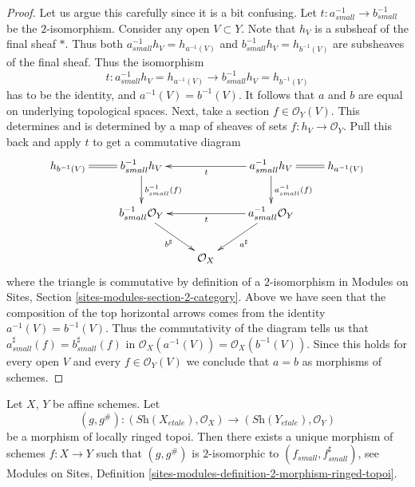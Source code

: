 \begin{proof}
Let us argue this carefully since it is a bit confusing.
Let $t : a_{small}^{-1} \to b_{small}^{-1}$ be the $2$-isomorphism.
Consider any open $V \subset Y$. Note that $h_V$ is a subsheaf of the
final sheaf $*$. Thus both $a_{small}^{-1}h_V = h_{a^{-1}(V)}$
and $b_{small}^{-1}h_V = h_{b^{-1}(V)}$ are subsheaves of the final sheaf.
Thus the isomorphism
$$
t : a_{small}^{-1}h_V = h_{a^{-1}(V)} \to b_{small}^{-1}h_V = h_{b^{-1}(V)}
$$
has to be the identity, and $a^{-1}(V) = b^{-1}(V)$.
It follows that $a$ and $b$ are equal on underlying topological spaces.
Next, take a section $f \in \mathcal{O}_Y(V)$. This determines and
is determined by a map of sheaves of sets
$f : h_V \to \mathcal{O}_Y$.
Pull this back and apply $t$ to get a commutative diagram
$$
\xymatrix{
h_{b^{-1}(V)} \ar@{=}[r] &
b_{small}^{-1}h_V \ar[d]^{b_{small}^{-1}(f)} & &
a_{small}^{-1}h_V \ar[d]^{a_{small}^{-1}(f)} \ar[ll]^t &
h_{a^{-1}(V)} \ar@{=}[l]
\\
& b_{small}^{-1}\mathcal{O}_Y
\ar[rd]_{b^\sharp}  & &
a_{small}^{-1}\mathcal{O}_Y \ar[ll]^t \ar[ld]^{a^\sharp} \\
& & \mathcal{O}_X
}
$$
where the triangle is commutative by definition of a $2$-isomorphism in
Modules on Sites, Section \ref{sites-modules-section-2-category}.
Above we have seen that the composition of the top horizontal
arrows comes from the identity $a^{-1}(V) = b^{-1}(V)$.
Thus the commutativity of the diagram tells us that
$a_{small}^\sharp(f) = b_{small}^\sharp(f)$ in
$\mathcal{O}_X(a^{-1}(V)) = \mathcal{O}_X(b^{-1}(V))$.
Since this holds for every open $V$ and every $f \in \mathcal{O}_Y(V)$
we conclude that $a = b$ as morphisms of schemes.
\end{proof}

\begin{lemma}
\label{lemma-morphism-ringed-etale-topoi-affines}
Let $X$, $Y$ be affine schemes.
Let
$$
(g, g^\#) :
(\textit{Sh}(X_{etale}), \mathcal{O}_X)
\longrightarrow
(\textit{Sh}(Y_{etale}), \mathcal{O}_Y)
$$
be a morphism of locally ringed topoi. Then there exists a
unique morphism of schemes $f : X \to Y$ such that
$(g, g^\#)$ is $2$-isomorphic to $(f_{small}, f_{small}^\sharp)$,
see
Modules on Sites,
Definition \ref{sites-modules-definition-2-morphism-ringed-topoi}.
\end{lemma}

